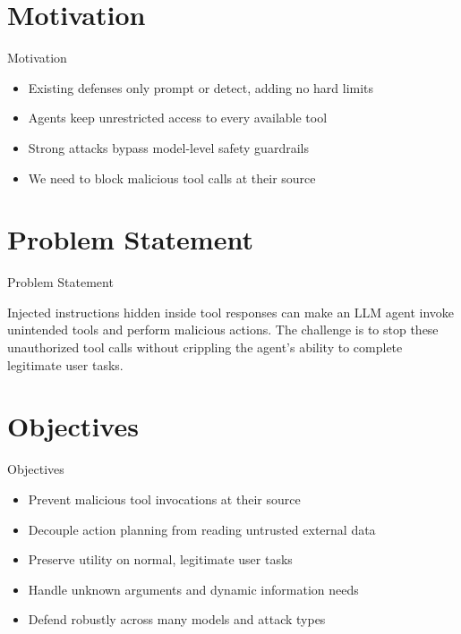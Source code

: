 \documentclass[10pt]{beamer}
\begin{document}
\section{Motivation}
\begin{frame}{Motivation}
\begin{itemize}
  \item Existing defenses only prompt or detect, adding no hard limits
  \item Agents keep unrestricted access to every available tool
  \item Strong attacks bypass model-level safety guardrails
  \item We need to block malicious tool calls at their source
\end{itemize}
\end{frame}

\section{Problem Statement}
\begin{frame}{Problem Statement}
  \begin{block}{}
  Injected instructions hidden inside tool responses can make an LLM agent invoke unintended tools and perform malicious actions. The challenge is to stop these unauthorized tool calls without crippling the agent's ability to complete legitimate user tasks.
  \end{block}
\end{frame}

\section{Objectives}
\begin{frame}{Objectives}
\begin{itemize}
  \item Prevent malicious tool invocations at their source
  \item Decouple action planning from reading untrusted external data
  \item Preserve utility on normal, legitimate user tasks
  \item Handle unknown arguments and dynamic information needs
  \item Defend robustly across many models and attack types
\end{itemize}
\end{frame}
\end{document}
